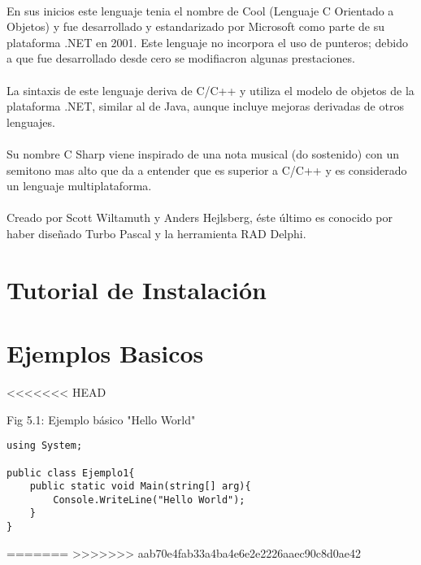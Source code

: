 \documentclass[11pt]{article} %
\begin{document}
\paragraph{ }
En sus inicios este lenguaje tenia el nombre de Cool (Lenguaje C Orientado a Objetos) y fue desarrollado y estandarizado por Microsoft como parte de su plataforma .NET en 2001. Este lenguaje no incorpora el uso de punteros; debido a que fue desarrollado desde cero se modifiacron algunas prestaciones.
\paragraph{ }
La sintaxis de este lenguaje deriva de C/C++ y utiliza el modelo de objetos de la plataforma .NET, similar al de Java, aunque incluye mejoras derivadas de otros lenguajes.
\paragraph{ }
Su nombre C Sharp viene inspirado de una nota musical (do sostenido) con un semitono mas alto que da a entender que es superior a  C/C++ y es considerado un lenguaje multiplataforma.
\paragraph{ }
Creado por Scott Wiltamuth y Anders Hejlsberg, éste último es conocido por haber diseñado Turbo Pascal y la herramienta RAD Delphi.

\section{Tutorial de Instalación}


\section{Ejemplos Basicos}
<<<<<<< HEAD


Fig 5.1: Ejemplo básico "Hello World"
\lstset{style=sharpc}
\begin{lstlisting}[frame=single]
using System;

public class Ejemplo1{
	public static void Main(string[] arg){
		Console.WriteLine("Hello World");
	}
}
\end{lstlisting}
=======
>>>>>>> aab70e4fab33a4ba4e6e2e2226aaec90c8d0ae42
\end{document}
